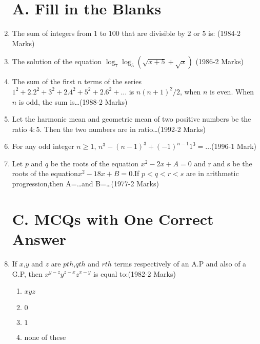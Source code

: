 \documentclass[journal,12pt,onecolumn]{IEEEtran}
\theoremstyle{remark}
\begin{document}
\begin{enumerate}
\section{A. Fill in the Blanks}


	\item  The sum of integers from 1 to $100$ that are divisible by $2$ or $5$ is: \hfill{(1984-2 Marks)}
    
    
	    \item  The solution of the equation                                    
       ${\log_{7}\log_{5}(\sqrt{x+5}+\sqrt{x})}$ \hfill{(1986-2 Marks)}
     
     
	     \item The sum of the first $n$ terms of the series ${1^2+2.2^2+3^2+2.4^2+5^2+2.6^2+\dots}$ is
   ${n (n+1)^2 /2}$, when $n$ is even. When $n$ is odd, the sum 
   is\dots\hfill{(1988-2 Marks)}
        
          
		  \item Let the harmonic mean and geometric mean of two positive numbers be the ratio $4:5$. Then the two numbers are in 
    ratio\dots\hfill{(1992-2 Marks)}
          
     
	     \item For any odd integer $n \ge 1$, ${n^3-(n-1)^3+(-1)^{n-1} 1^3=\dots}$\hfill{(1996-1 Mark)}
       
     
	     \item  Let $p$ and $q$ be the roots of the equation                    ${x^2-2x+A=0}$ and r and s be the roots of the                     equation${x^2-18x+B=0}$.If ${p<q<r<s}$ are                                      in arithmetic progression,then A=\dots and B=\dots\hfill{(1977-2 Marks)}
     
    
    \section{ C. MCQs with One Correct Answer}
        
    
	    \item  If $x$,$y$ and $z$ are $pth$,$qth$ and $rth$ terms respectively of an A.P and also of a G.P, then ${x^{y-z} y^{z-x} z^{x-y}}$ 
        is equal to:\hfill{(1982-2 Marks)}
\begin{enumerate} 
  \item $xyz$ 
  \item $0$
  \item $1$ 
  \item none of these
  \end{enumerate}


\end{enumerate}
\end{document}
